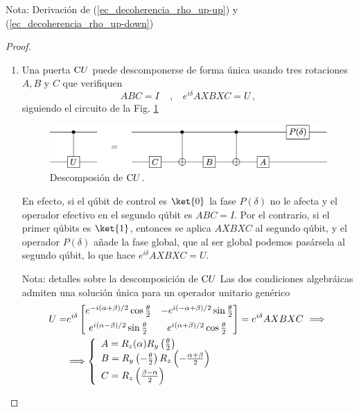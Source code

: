\documentclass[a4paper,11pt]{book} %
\numberwithin{equation}{chapter}
\newcommand{\cg}[1]{{\rm C}#1}
\begin{document}
\begin{mybox_blue}{Nota: Derivación de (\ref{ec_decoherencia_rho_up-up}) y  (\ref{ec_decoherencia_rho_up-down})}
\begin{proof}
\begin{enumerate}
		\item Una puerta $\cg{U}$ puede descomponerse de forma única usando tres rotaciones $A, B$ y $C$ que verifiquen
		\begin{equation}
		ABC = I ~~~~~,~~~~ e^{i\delta}  AXBXC = U\, ,
		\end{equation}
		siguiendo el circuito de la Fig. \ref{Fig_universal_CUdecomposition}
			\begin{figure}[H]
			\centering 
			\includegraphics[width=0.65\linewidth]{Figuras/Fig_universal_CUdecomposition}
			\caption{Descomposión de $\cg{U}$.}
			\label{Fig_universal_CUdecomposition}
			\end{figure}
		En efecto, si el qúbit de control es $\ket{0}$ la fase $P(\delta)$ no le afecta y el operador efectivo en el segundo 
		qúbit es $ABC= I$. Por el contrario, si el primer qúbits es $\ket{1}$, entonces se aplica $AXBXC$ al segundo qúbit, y 
		el operador $P(\delta)$ añade la fase global, que al ser global podemos pasársela al segundo qúbit, lo que hace 
		$e^{i\delta} AXBXC = U$.
		
		\begin{mybox_blue}{Nota: detalles sobre la descomposición de $\cg {U}$}
		Las dos condiciones  algebráicas admiten una solución única para un operador unitario genérico  
		\begin{align*}
		U = & e^{i\delta} 
		\begin{bmatrix} 
     		e^{-i(\alpha+\beta)/2} \cos\frac{\theta}{2}  &  - e^{i(-\alpha+\beta)/2}\sin\frac{\theta}{2}  \\  \rule{0mm}{5mm}
	    	e^{i(\alpha-\beta)/2}\sin\frac{\theta}{2}    &  e^{i(\alpha+\beta)/2}\cos\frac{\theta}{2}
		\end{bmatrix} 
		= e^{i\delta} AXBXC ~  \Longrightarrow ~ \\ \vspace{5mm}
		& \Longrightarrow 	
		\left\{ \begin{array}{l} 
			A = R_z(\alpha) R_y\left(\frac{\theta}{2}\right) \\ 
			B = R_y\left(-\frac{\theta}{2}\right) R_z\left(-\frac{\alpha + \beta}{2}\right) \\
			C = R_z\left( \frac{\beta-\alpha}{2}\right)
		\end{array} \right.
		\end{align*}				


\end{mybox_blue}
\end{enumerate}
\end{proof}
\end{mybox_blue}
\end{document}
